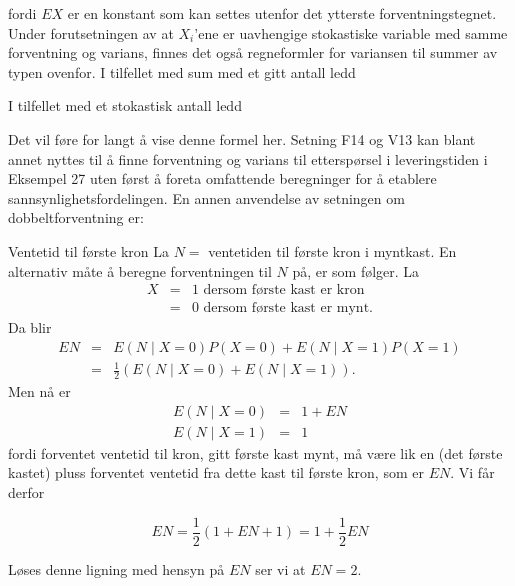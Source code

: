 \noindent fordi $EX$ er en konstant som kan settes utenfor det ytterste
forventningstegnet.
Under forutsetningen av at $X_i$'ene er uavhengige stokastiske
variable med samme forventning og varians, finnes det også
regneformler for variansen til summer av typen ovenfor. I
tilfellet med sum med et gitt antall ledd
\begin{center} \framebox[10cm]{\begin{minipage}{9cm}
\[ \mbox{\ \ \ V12. \ \ \ \ }varS_n = n var X.   \]
\mbox{} \vspace{-0.5\belowdisplayskip}  \end{minipage}} \end{center}
\noindent I tilfellet med et stokastisk antall ledd
\begin{center} \framebox[10cm]{\begin{minipage}{9cm}
\[ \mbox{\ \ \ V13. \ \ \ \ } var S_N = EN\cdot var X + var N\cdot (EX)^2. \]
\mbox{} \vspace{-0.5\belowdisplayskip}  \end{minipage}} \end{center}
\noindent Det vil føre for langt å vise denne formel her.
Setning F14 og V13 kan blant annet nyttes til å finne
forventning og varians til etterspørsel i leveringstiden i
Eksempel 27 uten først å foreta omfattende beregninger for å
etablere sannsynlighetsfordelingen.
En annen anvendelse av setningen om dobbeltforventning er: \\


\begin{eksempel}{Ventetid til første kron}
La $N=$ ventetiden til første kron i myntkast.
En alternativ måte å beregne forventningen til $N$ på, er som
følger. La
\begin{eqnarray*}
     X&=&1 \mbox{\ \ dersom første kast er kron} \\
      &=&0 \mbox{\ \ dersom første kast er mynt.}
\end{eqnarray*}
\noindent Da blir
\begin{eqnarray*}
     EN&=&E(N\mid X=0)P(X=0)+E(N\mid X=1)P(X=1) \\
       &=&\frac{1}{2}(E(N\mid X=0)+E(N\mid X=1)).
\end{eqnarray*}
\noindent Men nå er
\begin{eqnarray*}
     E(N\mid X=0)&=&1+EN \\
     E(N\mid X=1)&=&1
\end{eqnarray*}
\noindent fordi forventet ventetid til kron, gitt første kast mynt, må
være lik en (det første kastet) pluss forventet ventetid fra dette
kast til første kron, som er $EN$. Vi får derfor

\[       EN=\frac{1}{2}(1+EN+1)=1+\frac{1}{2}EN \]

\noindent Løses denne ligning med hensyn på $EN$ ser vi at $EN = 2$.
\end{eksempel}

